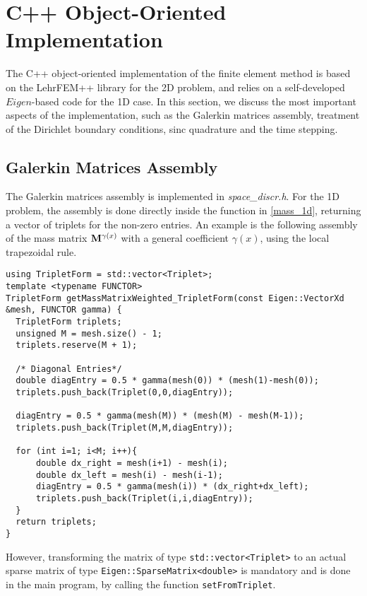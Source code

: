 \section{C++ Object-Oriented Implementation}
The C++ object-oriented implementation of the finite element method is based on the LehrFEM++ library for the 2D problem, and relies on a self-developed $Eigen$-based code for the 1D case. In this section, we discuss the most important aspects of the implementation, such as the Galerkin matrices assembly, treatment of the Dirichlet boundary conditions, sinc quadrature and the time stepping.

\subsection{Galerkin Matrices Assembly}
The Galerkin matrices assembly is implemented in \textit{space\_discr.h}.
For the 1D problem, the assembly is done directly inside the function in \eqref{mass_1d}, returning a vector of triplets for the non-zero entries. An example is the following assembly of the mass matrix $\mathbf{M}^{\gamma(x)}$ with a general coefficient $\gamma(x)$, using the local trapezoidal rule.
\begin{lstlisting}[caption={1D assembly of the mass matrix with general coefficient $\gamma$.}, label={mass_1d}] 
using TripletForm = std::vector<Triplet>; 
template <typename FUNCTOR>
TripletForm getMassMatrixWeighted_TripletForm(const Eigen::VectorXd &mesh, FUNCTOR gamma) {
  TripletForm triplets;
  unsigned M = mesh.size() - 1;
  triplets.reserve(M + 1);

  /* Diagonal Entries*/
  double diagEntry = 0.5 * gamma(mesh(0)) * (mesh(1)-mesh(0)); 
  triplets.push_back(Triplet(0,0,diagEntry));
  
  diagEntry = 0.5 * gamma(mesh(M)) * (mesh(M) - mesh(M-1)); 
  triplets.push_back(Triplet(M,M,diagEntry));
  
  for (int i=1; i<M; i++){
	  double dx_right = mesh(i+1) - mesh(i);
	  double dx_left = mesh(i) - mesh(i-1); 
	  diagEntry = 0.5 * gamma(mesh(i)) * (dx_right+dx_left);
	  triplets.push_back(Triplet(i,i,diagEntry));
  }
  return triplets;
}
\end{lstlisting}
However, transforming the matrix of type \lstinline{std::vector<Triplet>} to an actual sparse matrix of type \lstinline{Eigen::SparseMatrix<double>} is mandatory and is done in the main program, by calling the function \lstinline{setFromTriplet}. \\ \\
